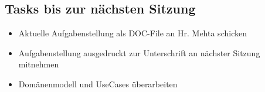 \documentclass[class=scrbook,crop=false]{standalone}
\begin{document}
    \subsection*{Tasks bis zur nächsten Sitzung}
    
    \begin{itemize}
        \item Aktuelle Aufgabenstellung als DOC-File an Hr. Mehta schicken
        \item Aufgabenstellung ausgedruckt zur Unterschrift an nächster Sitzung mitnehmen
        \item Domänenmodell und UseCases überarbeiten
    \end{itemize}
\end{document}
